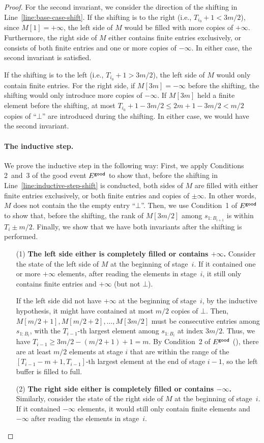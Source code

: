 \begin{proof}
    For the second invariant, we consider the direction of the shifting in Line~\ref{line:base-case-shift}. If the shifting is to the right (i.e., $T_{i_0} + 1 < 3m/2$), since $M[1] = +\infty$, the left side of $M$ would be filled with more copies of $+\infty$. Furthermore, the right side of $M$ either contains finite entries exclusively, or consists of both finite entries and one or more copies of $-\infty$. In either case, the second invariant is satisfied.

    If the shifting is to the left (i.e., $T_{i_0} + 1 > 3m/2$), the left side of $M$ would only contain finite entries.  For the right side, if $M[3m] = -\infty$ before the shifting, the shifting would only introduce more copies of $-\infty$. If $M[3m]$ held a finite element before the shifting, at most $T_{i_0} + 1 - 3m/2 \le 2m + 1 - 3m/2 < m/2$ copies of ``$\bot$'' are introduced during the shifting. In either case, we would have the second invariant.
    
    \paragraph{The inductive step.} We prove the inductive step in the following way: First, we apply Conditions 2~and~3 of the good event $E^{\textsf{good}}$ to show that, before the shifting in Line~\ref{line:inductive-step-shift} is conducted, both sides of $M$ are filled with either finite entries exclusively, or both finite entries and copies of $\pm\infty$. In other words, $M$ does not contain the the empty entry ``$\bot$''. Then, we use Condition~1 of $E^{\textsf{good}}$ to show that, before the shifting, the rank of $M[3m/2]$ among $s_{1:B_{i+1}}$ is within $T_i \pm m/2$. Finally, we show that we have both invariants after the shifting is performed.
    \begin{enumerate}
        \item[(1)]  \textbf{The left side either is completely filled or contains $+\infty$.} Consider the state of the left side of $M$ at the beginning of stage~$i$. If it contained one or more $+\infty$ elements, after reading the elements in stage~$i$, it still only contains finite entries and $+\infty$ (but not $\bot$).
    
        If the left side did not have $+\infty$ at the beginning of stage~$i$, by the inductive hypothesis, it might have contained at most $m/2$ copies of $\bot$. Then, $M[m/2+1], M[m/2+2], \ldots, M[3m/2]$ must be consecutive entries among $s_{1:B_i}$, with the $T_{i-1}$-th largest element among $s_{1:B_i}$ at index $3m/2$. Thus, we have $T_{i-1} \ge 3m/2 - (m/2+1) + 1 = m$. By Condition~2 of $E^{\textsf{good}}$ (), there are at least $m/2$ elements at stage $i$ that are within the range of the $[T_{i-1}-m+1, T_{i-1}]$-th largest element at the end of stage $i-1$, so the left buffer is filled to full. 
    \item[(2)] \textbf{The right side either is completely filled or contains $-\infty$.}  Similarly, consider the state of the right side of $M$ at the beginning of stage~$i$. If it contained $-\infty$ elements, it would still only contain finite elements and $-\infty$ after reading the elements in stage~$i$.
    

\end{enumerate}
\end{proof}

